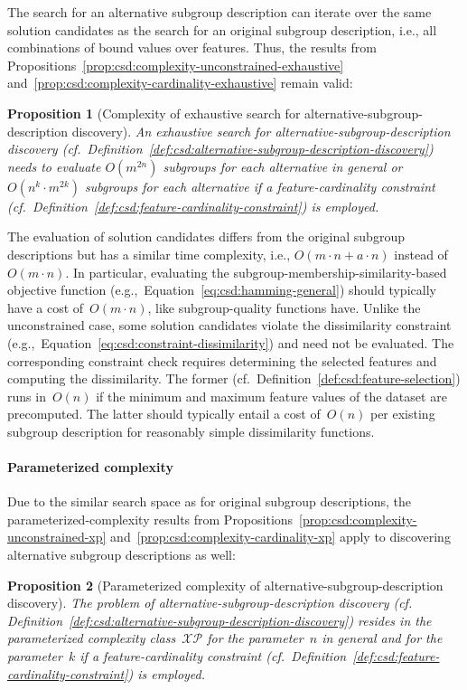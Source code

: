 \documentclass{article}
\newtheorem{proposition}{Proposition}
\theoremstyle{definition}
\begin{document}
The search for an alternative subgroup description can iterate over the same solution candidates as the search for an original subgroup description, i.e., all combinations of bound values over features.
Thus, the results from Propositions~\ref{prop:csd:complexity-unconstrained-exhaustive} and~\ref{prop:csd:complexity-cardinality-exhaustive} remain valid:
%
\begin{proposition}[Complexity of exhaustive search for alternative-subgroup-description discovery]
	An exhaustive search for alternative-subgroup-description discovery (cf.~Definition~\ref{def:csd:alternative-subgroup-description-discovery})
	needs to evaluate $O(m^{2n})$ subgroups for each alternative in general or $O(n^k \cdot m^{2k})$ subgroups for each alternative if a feature-cardinality constraint (cf.~Definition~\ref{def:csd:feature-cardinality-constraint}) is employed.
	\label{prop:csd:complexity-alternatives-exhaustive}
\end{proposition}
%
The evaluation of solution candidates differs from the original subgroup descriptions but has a similar time complexity, i.e., $O(m \cdot n + a \cdot n)$ instead of $O(m \cdot n)$.
In particular, evaluating the subgroup-membership-similarity-based objective function (e.g.,~Equation~\ref{eq:csd:hamming-general}) should typically have a cost of~$O(m \cdot n)$, like subgroup-quality functions have.
Unlike the unconstrained case, some solution candidates violate the dissimilarity constraint (e.g.,~Equation~\ref{eq:csd:constraint-dissimilarity}) and need not be evaluated.
The corresponding constraint check requires determining the selected features and computing the dissimilarity.
The former (cf.~Definition~\ref{def:csd:feature-selection}) runs in~$O(n)$ if the minimum and maximum feature values of the dataset are precomputed.
The latter should typically entail a cost of~$O(n)$ per existing subgroup description for reasonably simple dissimilarity functions.

\paragraph{Parameterized complexity}

Due to the similar search space as for original subgroup descriptions, the parameterized-complexity results from Propositions~\ref{prop:csd:complexity-unconstrained-xp} and~\ref{prop:csd:complexity-cardinality-xp} apply to discovering alternative subgroup descriptions as well:
\begin{proposition}[Parameterized complexity of alternative-subgroup-description discovery]
	The problem of alternative-subgroup-description discovery (cf. Definition~\ref{def:csd:alternative-subgroup-description-discovery}) resides in the parameterized complexity class~$\mathcal{XP}$ for the parameter~$n$ in general and for the parameter~$k$ if a feature-cardinality constraint (cf.~Definition~\ref{def:csd:feature-cardinality-constraint}) is employed.
	\label{prop:csd:complexity-alternatives-xp}
\end{proposition}
\end{document}
